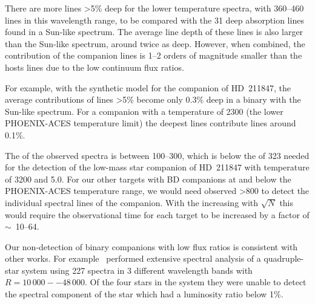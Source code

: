 There are more lines >5\% deep for the lower temperature spectra, with 360--460 lines in this wavelength range, to be compared with the 31 deep absorption lines found in a Sun-like spectrum.
The average line depth of these lines is also larger than the Sun-like spectrum, around twice as deep.
However, when combined, the contribution of the companion lines is 1--2 orders of magnitude smaller than the hosts lines due to the low continuum flux ratios.

For example, with the synthetic model for the companion of {HD~211847}, the average contributions of lines >5\% become only 0.3\% deep in a binary with the Sun-like spectrum.
For a companion with a temperature of 2300\K{} (the lower {PHOENIX-ACES} temperature limit) the deepest lines contribute lines around 0.1\%.


The \snr{} of the observed spectra is between 100--300, which is below the \snr{} of 323 needed for the detection of the low-mass star companion of {HD~211847} with temperature of 3200\K{} and \logg{} 5.0.
For our other targets with {BD} companions at and below the {PHOENIX-ACES} temperature range, we would need observed \snr{} >800 to detect the individual spectral lines of the companion.
With the \snr{} increasing with \(\sqrt{N}\) this would require the observational time for each target to be increased by a factor of \(\sim\)~10--64.

Our non-detection of binary companions with low flux ratios is consistent with other works.
For example~\citet{nemravova_xtauri_2016} performed extensive spectral analysis of a quadruple-star system  using 227 spectra in 3 different wavelength bands with \(R=10\,000--48\,000\).
Of the four stars in the system they were unable to detect the spectral component of the star which had a luminosity ratio below 1\%.



